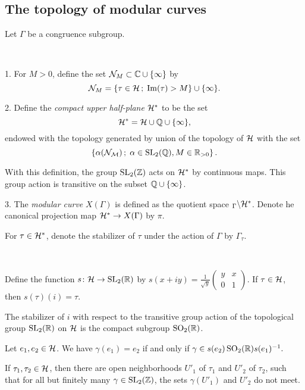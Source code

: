 \subsection{The topology of modular curves}

Let $\Gamma$ be a congruence subgroup.

\begin{defi} \ 

  1. For $M>0$, define the set $\mathcal{N}_M \subset \mathbb{C}\cup\{\infty\}$ by
  \[\mathcal{N}_M=\left\{\tau\in\mathcal{H}\,;\; \operatorname{Im}(\tau)>M\right\}\cup\{\infty\}.\]

  2. Define the \emph{compact upper half-plane} $\mathcal{H}^*$ to be the set
  \[\mathcal{H}^*=\mathcal{H}\cup\mathbb{Q}\cup\{\infty\},\]
  endowed with the topology generated by union of the topology of $\mathcal{H}$ with the set
  \[\left\{\alpha(\mathcal{N_M})\,;\; \alpha\in\operatorname{SL}_2(\mathbb{Q}), M\in\mathbb{R}_{>0}\right\}.\]

  With this definition, the group $\operatorname{SL}_2(\mathbb{Z})$ acts on $\mathcal{H}^*$ by continuous maps. This group action is transitive on the subset $\mathbb{Q}\cup\{\infty\}$.

  3. The \emph{modular curve} $X(\Gamma)$ is defined as the quotient space $_\Gamma\backslash\mathcal{H}^*$. Denote he canonical projection map $\mathcal{H}^*\to X(\Gamma)$ by $\pi$.
\end{defi}

For $\tau\in\mathcal{H}^*$, denote the stabilizer of $\tau$ under the action of $\Gamma$ by $\Gamma_\tau$.

\begin{rmk}\label{pr:real-op} \ 

  Define the function $s\colon\mathcal{H}\to\operatorname{SL}_2(\mathbb{R})$ by $s(x+iy)=\frac{1}{\sqrt{y}}\left(\begin{smallmatrix}y & x \\ 0 & 1\end{smallmatrix}\right)$. If $\tau\in\mathcal{H}$, then $s(\tau)(i)=\tau$.
 
  The stabilizer of $i$ with respect to the transitive group action of the topological group $\operatorname{SL}_2(\mathbb{R})$ on $\mathcal{H}$ is the compact subgroup $\operatorname{SO}_2(\mathbb{R})$.
 
  Let $e_1,e_2\in\mathcal{H}$. We have $\gamma(e_1)=e_2$ if and only if $\gamma\in s(e_2)\operatorname{SO}_2(\mathbb{R})s(e_1)^{-1}.$
\end{rmk}

\begin{prop}
 If $\tau_1, \tau_2\in\mathcal{H}$, then there are open neighborhoods $U'_1$ of $\tau_1$ and $U'_2$ of $\tau_2$, such that for all but finitely many $\gamma\in\operatorname{SL}_2(\mathbb{Z})$, the sets $\gamma(U'_1)$ and $U'_2$ do not meet.
\end{prop}

